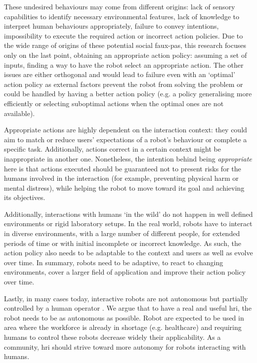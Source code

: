     These undesired behaviours may come from different origins: lack of sensory capabilities to identify necessary environmental features, lack of knowledge to interpret human behaviours appropriately, failure to convey intentions, impossibility to execute the required action or incorrect action policies. Due to the wide range of origins of these potential social faux-pas, this research focuses only on the last point, obtaining an appropriate action policy: assuming a set of inputs, finding a way to have the robot select an appropriate action. The other issues are either orthogonal and would lead to failure even with an `optimal' action policy as external factors prevent the robot from solving the problem or could be handled by having a better action policy (e.g. a policy generalising more efficiently or selecting suboptimal actions when the optimal ones are not available).%
    
    Appropriate actions are highly dependent on the interaction context: they could aim to match or reduce users' expectations of a robot's behaviour or complete a specific task. Additionally, actions correct in a certain context might be inappropriate in another one. Nonetheless, the intention behind being \textit{appropriate} here is that actions executed should be guaranteed not to present risks for the humans involved in the interaction (for example, preventing physical harm or mental distress), while helping the robot to move toward its goal and achieving its objectives.

    Additionally, interactions with humans `in the wild' \citep{belpaeme2012multimodal} do not happen in well defined environments or rigid laboratory setups. In the real world, robots have to interact in diverse environments, with a large number of different people, for extended periods of time or with initial incomplete or incorrect knowledge. As such, the action policy also needs to be adaptable to the context and users as well as evolve over time. In summary, robots need to be adaptive, to react to changing environments, cover a larger field of application and improve their action policy over time.

    Lastly, in many cases today, interactive robots are not autonomous but partially controlled by a human operator \citep{riek2012wizard}. We argue that to have a real and useful \gls{hri}, the robot needs to be as autonomous as possible. %
    Robot are expected to be used in area where the workforce is already in shortage (e.g. healthcare) and requiring humans to control these robots decrease widely their applicability. As a community, \gls{hri} should strive toward more autonomy for robots interacting with humans.
    
